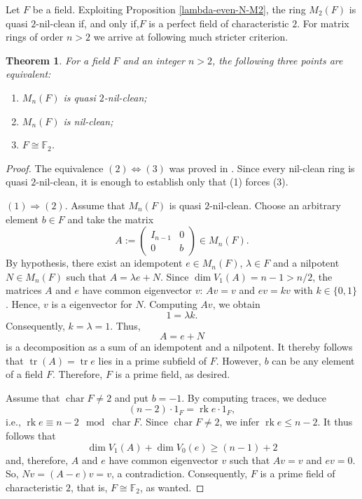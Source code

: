 \documentclass{amsart}
\DeclareMathOperator{\Char}{char}
\DeclareMathOperator{\tr}{tr}
\DeclareMathOperator{\rk}{rk}
\newtheorem{theorem}{Theorem}[section]
\theoremstyle{definition}
\theoremstyle{remark}
\numberwithin{equation}{section}
\begin{document}
Let $F$ be a field. Exploiting Proposition \ref{lambda-even-N-M2}, the ring $M_{2}(F)$ is quasi $2$-nil-clean if, and only if,$F$ is a perfect field of characteristic $2$. For matrix rings of order $n > 2$ we arrive at following much stricter criterion.

\begin{theorem}\label{lambda-2-N}
For a field $F$ and an integer $n > 2$, the following three points are equivalent:
\begin{enumerate}
\item $M_{n}(F)$ is quasi $2$-nil-clean;
\item $M_{n}(F)$ is nil-clean;
\item $F \cong \mathbb{F}_{2}$.
\end{enumerate}
\end{theorem}

\begin{proof} The equivalence $(2) \Leftrightarrow (3)$ was proved in \cite{BCDM13}. Since every nil-clean ring is quasi $2$-nil-clean, it is enough to establish only that (1) forces (3).

$(1) \Rightarrow (2)$. Assume that $M_{n}(F)$ is quasi $2$-nil-clean. Choose an arbitrary element $b \in F$ and take the matrix
\[
  A :=
  \left(
  \begin{array}{c|c}
    I_{n-1} & 0
    \\
    \hline
    0 & b
  \end{array}
  \right) \in M_{n}(F).
\]
By hypothesis, there exist an idempotent $e \in M_{n}(F)$, $\lambda \in F$ and a nilpotent $N \in M_{n}(F)$ such that
$A = \lambda e + N$. Since $\dim V_{1}(A) = n-1 > n/2$, the matrices $A$ and $e$ have common eigenvector $v$: $Av = v$ and $ev = kv$ with $k \in \{0,1\}$. Hence, $v$ is a eigenvector for $N$. Computing $Av$, we obtain
\[
  1 = \lambda k.
\]
Consequently, $k = \lambda = 1$. Thus,
\[
  A = e + N
\]
is a decomposition as a sum of an idempotent and a nilpotent. It thereby follows that $\tr (A) = \tr e$ lies in a prime subfield of $F$. However, $b$ can be any element of a field $F$. Therefore, $F$ is a prime field, as desired.

\medskip

Assume that $\Char F \not = 2$ and put $b = -1$. By computing traces, we deduce
\[
  (n-2) \cdot 1_{F} = \rk e \cdot 1_{F},
\]
i.e., $\rk e \equiv n-2 \mod \Char F$. Since $\Char F \not = 2$, we infer $\rk e \leq n-2$. It thus follows that $$\dim V_{1} (A) + \dim V_{0}(e) \geq (n-1) + 2$$ and, therefore, $A$ and $e$ have common eigenvector $v$ such that $Av = v$ and $ev = 0$. So, $Nv = (A-e)v = v$, a contradiction. Consequently, $F$ is a prime field of characteristic $2$, that is, $F \cong \mathbb{F}_{2}$, as wanted.
\end{proof}
\end{document}
